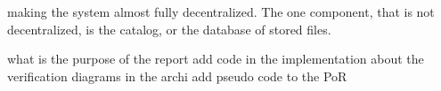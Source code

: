 making the system almost fully decentralized.
The one component, that is not decentralized, is the catalog, or the database of stored files.

what is the purpose of the report
add code in the implementation about the verification
diagrams in the archi
add pseudo code to the PoR
